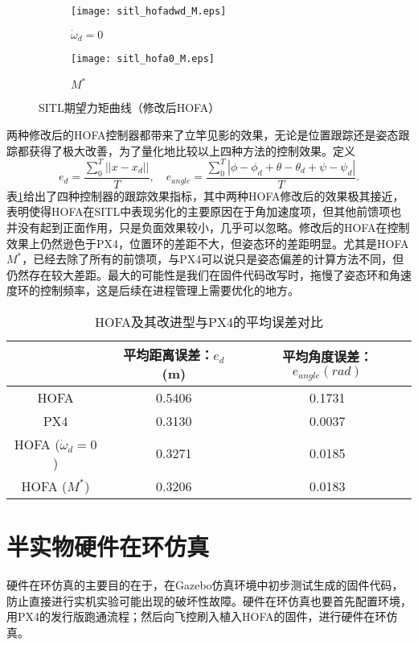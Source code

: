 \begin{figure}[H]
  \centering
\begin{subfigure}[b]{0.49\linewidth}
    \texttt{[image: sitl\_hofadwd\_M.eps]}
    \caption{$\dot \omega_d =0$}
\end{subfigure}
\hfill
\begin{subfigure}[b]{0.49\linewidth}
    \texttt{[image: sitl\_hofa0\_M.eps]}
    \caption{$M^*$}
\end{subfigure}
\caption{SITL期望力矩曲线（修改后HOFA）}
\label{SITL期望力矩曲线:HOFA改进}
\end{figure}

两种修改后的HOFA控制器都带来了立竿见影的效果，无论是位置跟踪还是姿态跟踪都获得了极大改善，为了量化地比较以上四种方法的控制效果。定义
$$e_d=\frac{\sum_0^{T}||x-x_d||}{T} ,\quad e_{angle}=\frac{\sum_0^{T}|\phi-\phi_d+\theta-\theta_d+\psi-\psi_d|}{T}.$$
表\ref{HOFA改}给出了四种控制器的跟踪效果指标，其中两种HOFA修改后的效果极其接近，表明使得HOFA在SITL中表现劣化的主要原因在于角加速度项，但其他前馈项也并没有起到正面作用，只是负面效果较小，几乎可以忽略。修改后的HOFA在控制效果上仍然逊色于PX4，位置环的差距不大，但姿态环的差距明显。尤其是HOFA$M^*$，已经去除了所有的前馈项，与PX4可以说只是姿态偏差的计算方法不同，但仍然存在较大差距。最大的可能性是我们在固件代码改写时，拖慢了姿态环和角速度环的控制频率，这是后续在进程管理上需要优化的地方。
\begin{table}[H]
  \centering
  \caption{HOFA及其改进型与PX4的平均误差对比}
  \label{HOFA改}
  \begin{tabular}{ccc}
      \toprule
      & 平均距离误差：$e_d$ (m)& 平均角度误差：$e_{angle}(rad)$  \\
      \midrule
      HOFA &0.5406  & 0.1731\\
      PX4 & 0.3130 &  0.0037\\
      HOFA ($\dot \omega_d=0$) & 0.3271 & 0.0185\\
      HOFA ($M^*$) &0.3206  & 0.0183\\
      \bottomrule
  \end{tabular}
\end{table}

\section{半实物硬件在环仿真}
硬件在环仿真的主要目的在于，在Gazebo仿真环境中初步测试生成的固件代码，防止直接进行实机实验可能出现的破坏性故障。硬件在环仿真也要首先配置环境，用PX4的发行版跑通流程；然后向飞控刷入植入HOFA的固件，进行硬件在环仿真。
